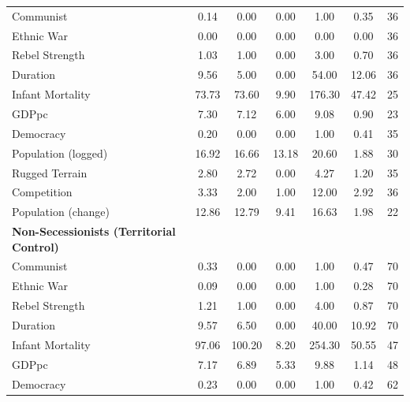 \documentclass[12pt, letterpaper]{article}
\begin{document}
\begin{center}
\begin{table}[htbp]
\begin{tabular}{l*{1}{cccccc}}
Communist           &        0.14&        0.00&        0.00&        1.00&        0.35&          36\\
Ethnic War          &        0.00&        0.00&        0.00&        0.00&        0.00&          36\\
Rebel Strength      &        1.03&        1.00&        0.00&        3.00&        0.70&          36\\
Duration            &        9.56&        5.00&        0.00&       54.00&       12.06&          36\\
Infant Mortality    &       73.73&       73.60&        9.90&      176.30&       47.42&          25\\
GDPpc               &        7.30&        7.12&        6.00&        9.08&        0.90&          23\\
Democracy           &        0.20&        0.00&        0.00&        1.00&        0.41&          35\\
Population (logged) &       16.92&       16.66&       13.18&       20.60&        1.88&          30\\
Rugged Terrain      &        2.80&        2.72&        0.00&        4.27&        1.20&          35\\
Competition         &        3.33&        2.00&        1.00&       12.00&        2.92&          36\\
Population (change) &       12.86&       12.79&        9.41&       16.63&        1.98&          22\\
\hline
\textbf{Non-Secessionists (Territorial Control)} \\
Communist           &        0.33&        0.00&        0.00&        1.00&        0.47&          70\\
Ethnic War          &        0.09&        0.00&        0.00&        1.00&        0.28&          70\\
Rebel Strength      &        1.21&        1.00&        0.00&        4.00&        0.87&          70\\
Duration            &        9.57&        6.50&        0.00&       40.00&       10.92&          70\\
Infant Mortality    &       97.06&      100.20&        8.20&      254.30&       50.55&          47\\
GDPpc               &        7.17&        6.89&        5.33&        9.88&        1.14&          48\\
Democracy           &        0.23&        0.00&        0.00&        1.00&        0.42&          62\\

\end{tabular}
\end{table}
\end{center}
\end{document}
